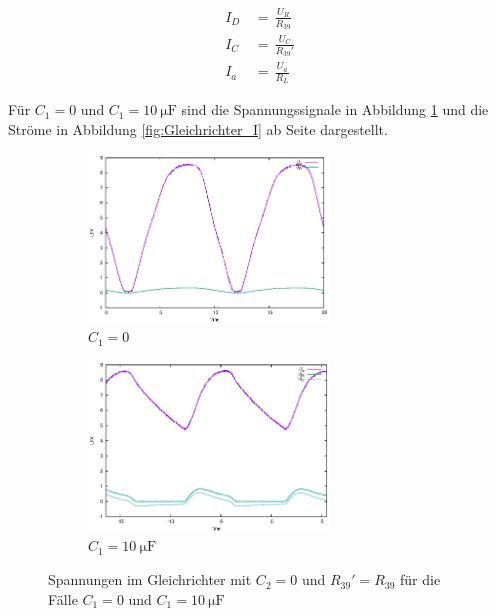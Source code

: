 \documentclass[10pt,a4paper]{scrartcl}
\begin{document}
\begin{align}
    I_D \,&=\,\frac{U_R}{R_{39}}\\
    I_C \,&=\,\frac{U_C}{R_{39}'}\\
    I_a \,&=\,\frac{U_a}{R_L}
\end{align}

Für $C_1=0$ und $C_1=10~\mathrm{\mu F}$ sind die Spannungssignale in Abbildung
\ref{fig:Gleichrichter_U} und die Ströme in Abbildung
\ref{fig:Gleichrichter_I} ab Seite \pageref{fig:Gleichrichter_U} dargestellt.

\begin{figure}[!ht]
    \begin{subfigure}{\textwidth}
        \centering
        \includegraphics[width=0.7\textwidth]{graphics/gleichrichter_0F.eps}
        \caption{$C_1=0$}
    \end{subfigure}
    \begin{subfigure}{\textwidth}
        \centering
        \includegraphics[width=0.7\textwidth]{graphics/gleichrichter_10uF.eps}
        \caption{$C_1=10~\mathrm{\mu F}$}
    \end{subfigure}
    \caption{Spannungen im Gleichrichter mit $C_2=0$ und $R_{39}'=R_{39}$ für
        die Fälle $C_1=0$ und $C_1=10~\mathrm{\mu F}$}
    \label{fig:Gleichrichter_U}
\end{figure}
\end{document}
